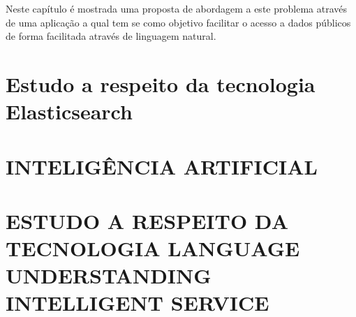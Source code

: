Neste capítulo é mostrada uma proposta de abordagem a este problema através de uma aplicação a qual tem se como objetivo facilitar o acesso a dados públicos de forma facilitada através de linguagem natural.

\section{Estudo a respeito da tecnologia Elasticsearch}


\section{\uppercase{Inteligência Artificial}}


\section{\uppercase{Estudo a respeito da tecnologia Language Understanding Intelligent Service}}



